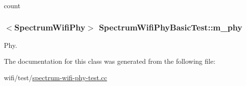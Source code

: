 count 

\subsubsection[{\texorpdfstring{m\+\_\+phy}{m_phy}}]{$<${\bf Spectrum\+Wifi\+Phy}$>$ Spectrum\+Wifi\+Phy\+Basic\+Test\+::m\+\_\+phy\hspace{0.3cm}{\ttfamily [protected]}}\hypertarget{classSpectrumWifiPhyBasicTest_aea1ad31a982e7321017675c050488bd6}{}\label{classSpectrumWifiPhyBasicTest_aea1ad31a982e7321017675c050488bd6}


Phy. 



The documentation for this class was generated from the following file\+:\begin{DoxyCompactItemize}
\item 
wifi/test/\hyperlink{spectrum-wifi-phy-test_8cc}{spectrum-\/wifi-\/phy-\/test.\+cc}\end{DoxyCompactItemize}
